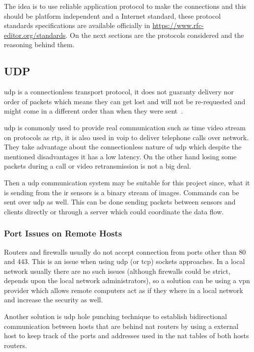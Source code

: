 \documentclass[hidelinks,11pt,a4paper,oneside,article]{memoir}
\begin{document}
The idea is to use reliable application protocol to make the connections and this should be platform independent and a Internet standard, these protocol standards specifications are available officially in \url{https://www.rfc-editor.org/standards}. On the next sections are the protocols considered and the reasoning behind them.


\subsection{UDP}
\Gls{udp} is a connectionless transport protocol, it does not guaranty delivery nor order of packets which means they can get lost and will not be re-requested and might come in a different order than when they were sent~\cite[18]{tcpip}.

\gls{udp} is commonly used to provide real communication such as time video stream on protocols as \gls{rtp}, it is also used in \gls{voip} to deliver telephone calls over network. They take advantage about the connectionless nature of \gls{udp} which despite  the mentioned disadvantages it has a low latency. On the other hand losing some packets during a call or video retransmission is not a big deal. 

Then a \gls{udp} communication system may be suitable for this project since, what it is sending from the \gls{ir} sensors is a binary stream of images. Commands can be sent over \gls{udp} as well.
This can be done sending packets between sensors and clients directly or through a server which could coordinate the data flow.

\subsubsection{Port Issues on Remote Hosts}\label{sec:port-issues-on-remote-hosts}
Routers and firewalls usually do not accept connection from ports other than 80 and 443. This is an issue when using \gls{udp} (or \gls{tcp}) sockets approaches. In a local network usually there are no such issues (although firewalls could be strict, depends upon the local network administrators), so a solution can be using a \gls{vpn} provider which allows remote computers act as if they where in a local network and increase the security as well.

Another solution is \gls{udp} hole punching technique to establish bidirectional communication between hosts that are behind \gls{nat} routers by using a external host to keep track of the ports and addresses used in the \gls{nat} tables of both hosts routers.
\end{document}

